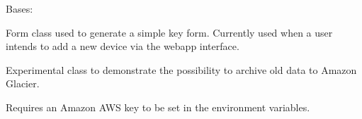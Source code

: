 \documentclass[letterpaper,10pt,english]{sphinxmanual}
\begin{document}
\begin{fulllineitems}
\label{modules/microdata:microdata.views.KeyForm}
Bases: 

Form class used to generate a simple key form. Currently used when a user intends to add a new device via the webapp interface.

\begin{fulllineitems}
\label{modules/microdata:microdata.views.KeyForm.base_fields}
\end{fulllineitems}


\begin{fulllineitems}
\label{modules/microdata:microdata.views.KeyForm.media}
\end{fulllineitems}


\end{fulllineitems}


\begin{fulllineitems}
\label{modules/microdata:microdata.views.initiate_job_to_glacier}
Experimental class to demonstrate the possibility to archive old data to Amazon Glacier.

Requires an Amazon AWS key to be set in the environment variables.

\end{fulllineitems}

\end{document}
